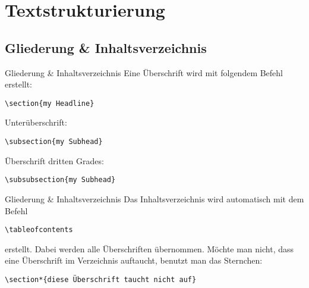 \section{Textstrukturierung}

\subsection{Gliederung \& Inhaltsverzeichnis}
\begin{frame}[fragile]{Gliederung \& Inhaltsverzeichnis}
Eine Überschrift wird mit folgendem Befehl erstellt:
\begin{lstlisting}[style=tex]
\section{my Headline}\end{lstlisting}
\pause
Unterüberschrift:
\begin{lstlisting}[style=tex]
\subsection{my Subhead}\end{lstlisting}
\pause
Überschrift dritten Grades:
\begin{lstlisting}[style=tex]
\subsubsection{my Subhead}\end{lstlisting}
\end{frame}

\begin{frame}[fragile]{Gliederung \& Inhaltsverzeichnis}
Das Inhaltsverzeichnis wird automatisch mit dem Befehl
\begin{lstlisting}[style=tex]
\tableofcontents
\end{lstlisting}
erstellt. Dabei werden alle Überschriften übernommen.
\pause
\newline
\newline
Möchte man nicht, dass eine Überschrift im Verzeichnis auftaucht, benutzt man das Sternchen:
\begin{lstlisting}[style=tex]
\section*{diese Überschrift taucht nicht auf}
\end{lstlisting}
\end{frame}

